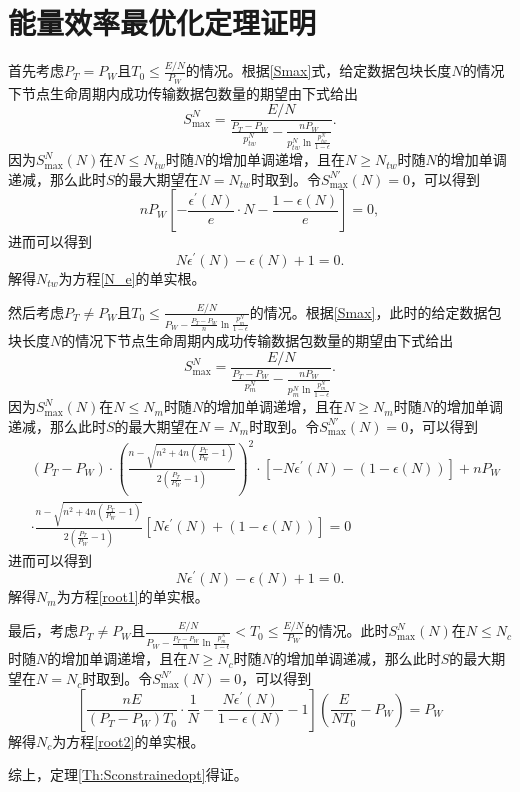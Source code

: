 \chapter{能量效率最优化定理证明}\label{app03}
首先考虑$P_T=P_W$且$T_0 \leq \frac{E/N}{P_W}$的情况。根据\eqref{Smax}式，给定数据包块长度$N$的情况下节点生命周期内成功传输数据包数量的期望由下式给出
\begin{equation}
S_{\max}^{N}=\frac{{E}/{N}}{\frac{P_T-P_W}{p_{tw}^N}-\frac{nP_W}{p_{tw}^N\ln{\frac{p_{tw}^N}{1-\epsilon}}}}.
\end{equation}
因为$S_{\max}^{N}(N)$在$N\leq N_{tw}$时随$N$的增加单调递增，且在$N\ge N_{tw}$时随$N$的增加单调递减，那么此时$S$的最大期望在$N=N_{tw}$时取到。令$S_{\max}^{N'}(N)=0$，可以得到
\begin{equation}
nP_W\left[-\frac{\epsilon^{\prime}(N)}{e}\cdot N-\frac{1-\epsilon(N)}{e}\right]=0,
\end{equation}
进而可以得到
\begin{equation}
N\epsilon^{\prime}(N)-\epsilon(N)+1=0.
\end{equation}
解得$N_{tw}$为方程\eqref{N_e}的单实根。

然后考虑$P_T \neq P_W$且$T_0\le\frac{E/N}{P_W-\frac{P_T-P_W}{n}\ln{\frac{p_m^N}{1-\epsilon}}}$的情况。根据\eqref{Smax}，此时的给定数据包块长度$N$的情况下节点生命周期内成功传输数据包数量的期望由下式给出
\begin{equation}\label{eq3}
S_{\max}^{N}=\frac{{E}/{N}}{\frac{P_T-P_W}{p_m^N}-\frac{nP_W}{p_m^N\ln{\frac{p_m^N}{1-\epsilon}}}}.
\end{equation}
因为$S_{\max}^{N}(N)$在$N\leq N_m$时随$N$的增加单调递增，且在$N\ge N_m$时随$N$的增加单调递减，那么此时$S$的最大期望在$N=N_m$时取到。令$S_{\max}^{N'}(N)=0$，可以得到
\begin{equation}\label{eq4}
\begin{aligned}
&(P_T-P_W)\cdot\left(\frac{n-\sqrt{n^2+4n\left(\frac{P_T}{P_W}-1\right)}}{2\left(\frac{P_T}{P_W}-1\right)}\right)^2\cdot[-N\epsilon^{\prime}(N)-(1-\epsilon(N))]+
nP_W\\
&\cdot\frac{n-\sqrt{n^2+4n\left(\frac{P_T}{P_W}-1\right)}}{2\left(\frac{P_T}{P_W}-1\right)}[N\epsilon^{\prime}(N)+(1-\epsilon(N))]=0
\end{aligned}
\end{equation}
进而可以得到
\begin{equation}\label{eq5}
N\epsilon^{\prime}(N)-\epsilon(N)+1=0.
\end{equation}
解得$N_m$为方程\eqref{root1}的单实根。

最后，考虑$P_T \neq P_W$且$\frac{E/N}{P_W-\frac{P_T-P_W}{n}\ln{\frac{p_m^N}{1-\epsilon}}}< T_0\le\frac{{E}/{N}}{P_W}$的情况。此时$S_{\max}^{N}(N)$在$N\leq N_c$时随$N$的增加单调递增，且在$N\ge N_c$时随$N$的增加单调递减，那么此时$S$的最大期望在$N=N_c$时取到。令$S_{\max}^{N'}(N)=0$，可以得到
\begin{equation}\label{eq6}
\left[\frac{nE}{(P_T-P_W)T_0}\cdot\frac{1}{N}-\frac{N\epsilon^{\prime}(N)}{1-\epsilon(N)}-1\right]\left(\frac{E}{NT_0}-P_W\right)=P_W
\end{equation}
解得$N_c$为方程\eqref{root2}的单实根。


综上，定理\ref{Th:Sconstrainedopt}得证。